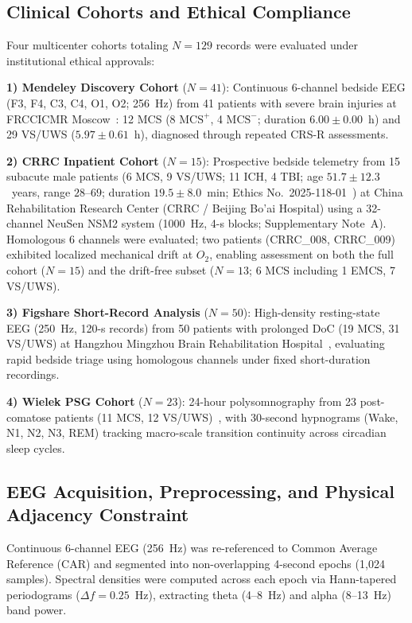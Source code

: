 \documentclass[journal,twoside,web]{ieeecolor}
\begin{document}
\subsection{Clinical Cohorts and Ethical Compliance}
Four multicenter cohorts totaling $N=129$ records were evaluated under institutional ethical approvals:

\textbf{1) Mendeley Discovery Cohort} ($N = 41$): Continuous 6-channel bedside EEG (F3, F4, C3, C4, O1, O2; 256~Hz) from 41 patients with severe brain injuries at FRCCICMR Moscow~\cite{nekrasova2020psg}: 12 MCS (8 $\text{MCS}^+$, 4 $\text{MCS}^-$; duration $6.00 \pm 0.00$~h) and 29 VS/UWS ($5.97 \pm 0.61$~h), diagnosed through repeated CRS-R assessments.

\textbf{2) CRRC Inpatient Cohort} ($N = 15$): Prospective bedside telemetry from 15 subacute male patients (6 MCS, 9 VS/UWS; 11 ICH, 4 TBI; age $51.7 \pm 12.3$~years, range $28\text{--}69$; duration $19.5 \pm 8.0$~min; Ethics No.~2025-118-01~\cite{duan2026auditory}) at China Rehabilitation Research Center (CRRC / Beijing Bo'ai Hospital) using a 32-channel NeuSen NSM2 system (1000~Hz, 4-s blocks; Supplementary Note~A). Homologous 6 channels were evaluated; two patients (CRRC\_008, CRRC\_009) exhibited localized mechanical drift at $O_2$, enabling assessment on both the full cohort ($N = 15$) and the drift-free subset ($N = 13$; 6 MCS including 1 EMCS, 7 VS/UWS).

\textbf{3) Figshare Short-Record Analysis} ($N = 50$): High-density resting-state EEG (250~Hz, 120-s records) from 50 patients with prolonged DoC (19 MCS, 31 VS/UWS) at Hangzhou Mingzhou Brain Rehabilitation Hospital~\cite{ling2024microstates,xu2021neural}, evaluating rapid bedside triage using homologous channels under fixed short-duration recordings.

\textbf{4) Wielek PSG Cohort} ($N = 23$): 24-hour polysomnography from 23 post-comatose patients (11 MCS, 12 VS/UWS)~\cite{wielek2018sleep}, with 30-second hypnograms (Wake, N1, N2, N3, REM) tracking macro-scale transition continuity across circadian sleep cycles.
\subsection{EEG Acquisition, Preprocessing, and Physical Adjacency Constraint}

\label{sec:preprocessing}
Continuous 6-channel EEG (256~Hz) was re-referenced to Common Average Reference (CAR) and segmented into non-overlapping 4-second epochs (1,024 samples). Spectral densities were computed across each epoch via Hann-tapered periodograms ($\Delta f = 0.25$~Hz), extracting theta (4--8~Hz) and alpha (8--13~Hz) band power.
\end{document}
